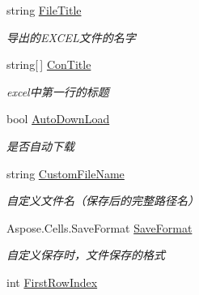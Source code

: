 \begin{DoxyCompactItemize}
string \hyperlink{class_x_c_l_net_tools_1_1_entity_1_1_data_handler_1_1_out_put_param_class_aac90dc3c94a5381b98f549a7193e2b52}{File\-Title}
\begin{DoxyCompactList}\small\item\em 导出的\-E\-X\-C\-E\-L文件的名字 \end{DoxyCompactList}\item 
string\mbox{[}$\,$\mbox{]} \hyperlink{class_x_c_l_net_tools_1_1_entity_1_1_data_handler_1_1_out_put_param_class_a941dbef632dfa1bd15bb948bd9c62b52}{Con\-Title}
\begin{DoxyCompactList}\small\item\em excel中第一行的标题 \end{DoxyCompactList}\item 
bool \hyperlink{class_x_c_l_net_tools_1_1_entity_1_1_data_handler_1_1_out_put_param_class_a791b5ebecdc31e065744a277e3fbc721}{Auto\-Down\-Load}
\begin{DoxyCompactList}\small\item\em 是否自动下载 \end{DoxyCompactList}\item 
string \hyperlink{class_x_c_l_net_tools_1_1_entity_1_1_data_handler_1_1_out_put_param_class_a44cec19f205a53ac8bd2889bc5393cf3}{Custom\-File\-Name}
\begin{DoxyCompactList}\small\item\em 自定义文件名（保存后的完整路径名） \end{DoxyCompactList}\item 
Aspose.\-Cells.\-Save\-Format \hyperlink{class_x_c_l_net_tools_1_1_entity_1_1_data_handler_1_1_out_put_param_class_a9028dbfeef7fda99f8aeda27caf342a3}{Save\-Format}
\begin{DoxyCompactList}\small\item\em 自定义保存时，文件保存的格式 \end{DoxyCompactList}\item 
int \hyperlink{class_x_c_l_net_tools_1_1_entity_1_1_data_handler_1_1_out_put_param_class_a80ab8ab1cb7ffb1a6757b5082c25d431}{First\-Row\-Index}

\end{DoxyCompactItemize}
